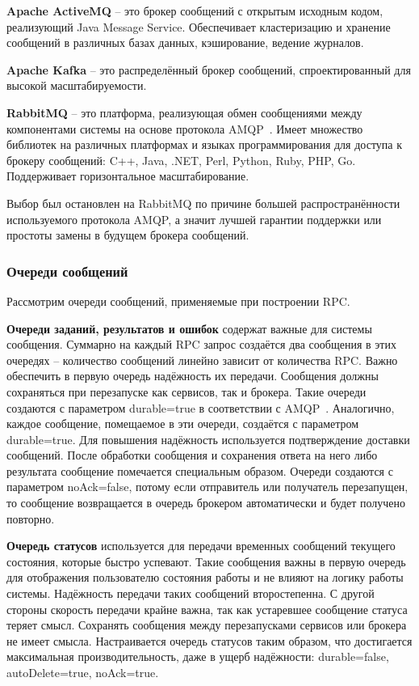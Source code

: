 \textbf{Apache ActiveMQ} -- это брокер сообщений с открытым исходным кодом,
реализующий Java Message Service. Обеспечивает кластеризацию и хранение
сообщений в различных базах данных, кэширование, ведение журналов.

\textbf{Apache Kafka} -- это распределённый брокер сообщений, спроектированный
для высокой масштабируемости.

\textbf{RabbitMQ} -- это платформа, реализующая обмен сообщениями между
компонентами системы на основе протокола AMQP~\cite{amqp}.
Имеет множество библиотек на различных платформах и языках программирования
для доступа к брокеру сообщений: C++, Java, .NET, Perl, Python, Ruby, PHP, Go.
Поддерживает горизонтальное масштабирование.

Выбор был остановлен на RabbitMQ по причине большей распространённости
используемого протокола AMQP, а значит лучшей гарантии поддержки или
простоты замены в будущем брокера сообщений.

\subsubsection{Очереди сообщений}
Рассмотрим очереди сообщений, применяемые при построении RPC.

\textbf{Очереди заданий, результатов и ошибок} содержат важные для системы
сообщения. Суммарно на каждый RPC запрос создаётся два сообщения
в этих очередях -- количество сообщений линейно зависит от количества RPC.
Важно обеспечить в первую очередь надёжность их передачи.
Сообщения должны сохраняться при перезапуске как сервисов, так и брокера.
Такие очереди создаются с параметром durable=true в соответствии
с AMQP~\cite{amqp}. Аналогично, каждое сообщение, помещаемое в эти очереди,
создаётся с параметром durable=true. Для повышения надёжность используется
подтверждение доставки сообщений. После обработки сообщения и сохранения
ответа на него либо результата сообщение помечается специальным образом.
Очереди создаются с параметром noAck=false, потому если отправитель
или получатель перезапущен, то сообщение возвращается в очередь
брокером автоматически и будет получено повторно.

\textbf{Очередь статусов} используется для передачи временных сообщений текущего
состояния, которые быстро успевают. Такие сообщения важны в первую очередь
для отображения пользователю состояния работы и не влияют на логику работы
системы. Надёжность передачи таких сообщений второстепенна. С другой стороны
скорость передачи крайне важна, так как устаревшее сообщение статуса
теряет смысл. Сохранять сообщения между перезапусками сервисов или брокера
не имеет смысла. Настраивается очередь статусов таким образом, что достигается
максимальная производительность, даже в ущерб надёжности: durable=false,
autoDelete=true, noAck=true.

